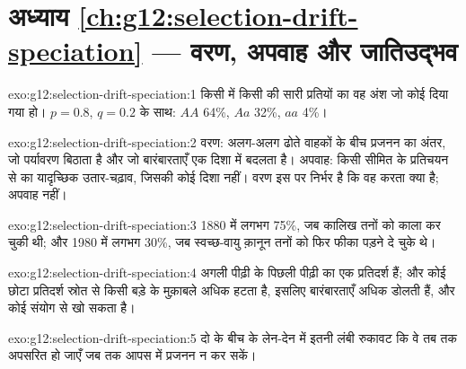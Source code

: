 \section*{अध्याय \ref{ch:g12:selection-drift-speciation} --- वरण, अपवाह और जातिउद्भव}

\begin{solution}{exo:g12:selection-drift-speciation:1}
किसी  में किसी  की सारी प्रतियों का वह अंश जो कोई दिया गया
 हो। $p = 0.8$, $q = 0.2$ के साथ: $AA$ 64\%, $Aa$ 32\%, $aa$ 4\%।
\end{solution}

\begin{solution}{exo:g12:selection-drift-speciation:2}
वरण: अलग-अलग  ढोते वाहकों के बीच प्रजनन का अंतर, जो पर्यावरण
बिठाता है और जो बारंबारताएँ एक दिशा में बदलता है। अपवाह: किसी सीमित 
के प्रतिचयन से  का यादृच्छिक उतार-चढ़ाव, जिसकी कोई दिशा नहीं।
वरण इस पर निर्भर है कि वह  करता क्या है; अपवाह नहीं।
\end{solution}

\begin{solution}{exo:g12:selection-drift-speciation:3}
1880 में लगभग 75\%, जब कालिख तनों को काला कर चुकी थी; और 1980 में लगभग
30\%, जब स्वच्छ-वायु क़ानून तनों को फिर फीका पड़ने दे चुके थे।
\end{solution}

\begin{solution}{exo:g12:selection-drift-speciation:4}
अगली पीढ़ी के  पिछली पीढ़ी का एक प्रतिदर्श हैं; और कोई छोटा
प्रतिदर्श स्रोत से किसी बड़े के मुक़ाबले अधिक हटता है, इसलिए बारंबारताएँ
अधिक डोलती हैं, और कोई  संयोग से खो सकता है।
\end{solution}

\begin{solution}{exo:g12:selection-drift-speciation:5}
दो  के बीच  के लेन-देन में इतनी लंबी रुकावट कि वे तब तक अपसरित हो
जाएँ जब तक आपस में प्रजनन न कर सकें।
\end{solution}

